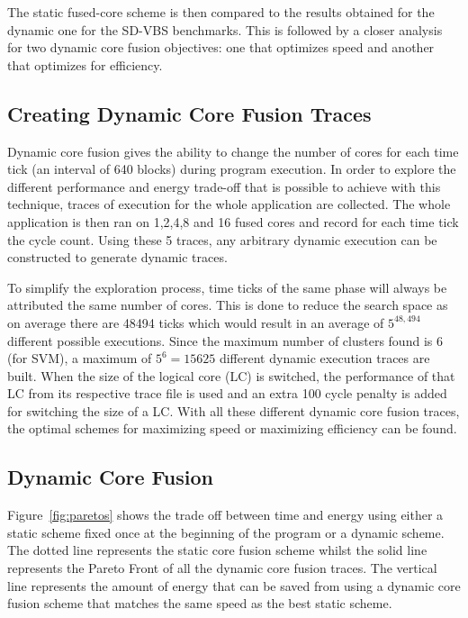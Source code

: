 The static fused-core scheme is then compared to the results obtained for the dynamic one for the SD-VBS benchmarks.
This is followed by a closer analysis for two dynamic core fusion objectives: one that optimizes speed and another that optimizes for efficiency.

\subsection{Creating Dynamic Core Fusion Traces}

Dynamic core fusion gives the ability to change the number of cores for each time tick (an interval of 640 blocks) during program execution.
In order to explore the different performance and energy trade-off that is possible to achieve with this technique, traces of execution for the whole application are collected.
The whole application is then ran on 1,2,4,8 and 16 fused cores and record for each time tick the cycle count.
Using these 5 traces, any arbitrary dynamic execution can be constructed to generate dynamic traces.

To simplify the exploration process, time ticks of the same phase will always be attributed the same number of cores.
This is done to reduce the search space as on average there are 48494 ticks which would result in an average of $5^{48,494}$ different possible executions.
Since the maximum number of clusters found is 6 (for SVM), a maximum of $5^{6} = 15625$ different dynamic execution traces are built.
When the size of the logical core (LC) is switched, the performance of that LC from its respective trace file is used and an extra 100 cycle penalty is added for switching the size of a LC.
With all these different dynamic core fusion traces, the optimal schemes for maximizing speed or maximizing efficiency can be found.

\subsection{Dynamic Core Fusion}
Figure~\ref{fig:paretos} shows the trade off between time and energy using either a static scheme fixed once at the beginning of the program or a dynamic scheme.
The dotted line represents the static core fusion scheme whilst the solid line represents the Pareto Front of all the dynamic core fusion traces.
The vertical line represents the amount of energy that can be saved from using a dynamic core fusion scheme that matches the same speed as the best static scheme.


